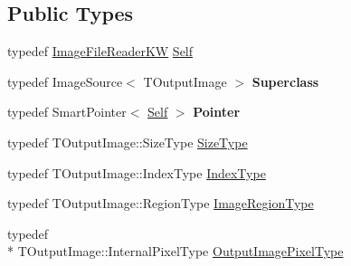 \subsection*{Public Types}
\begin{DoxyCompactItemize}
\item 
typedef \hyperlink{classitk_1_1_image_file_reader_k_w}{Image\-File\-Reader\-K\-W} \hyperlink{classitk_1_1_image_file_reader_k_w_a6616e1e0fe9f4aceb7f693250b5f5b5c}{Self}
\item 
\hypertarget{classitk_1_1_image_file_reader_k_w_afb5a9f09477bb47f45a4faf6832e74e4}{typedef Image\-Source$<$ T\-Output\-Image $>$ {\bfseries Superclass}}\label{classitk_1_1_image_file_reader_k_w_afb5a9f09477bb47f45a4faf6832e74e4}

\item 
\hypertarget{classitk_1_1_image_file_reader_k_w_a05a8d76fe334c335c3c432de498ca087}{typedef Smart\-Pointer$<$ \hyperlink{classitk_1_1_image_file_reader_k_w_a6616e1e0fe9f4aceb7f693250b5f5b5c}{Self} $>$ {\bfseries Pointer}}\label{classitk_1_1_image_file_reader_k_w_a05a8d76fe334c335c3c432de498ca087}

\item 
typedef T\-Output\-Image\-::\-Size\-Type \hyperlink{classitk_1_1_image_file_reader_k_w_a7a7f4acf918af20f820cdb57ab4ae18d}{Size\-Type}
\item 
typedef T\-Output\-Image\-::\-Index\-Type \hyperlink{classitk_1_1_image_file_reader_k_w_a9daa1ecf6fe0192e6ea86f9bf9785912}{Index\-Type}
\item 
typedef T\-Output\-Image\-::\-Region\-Type \hyperlink{classitk_1_1_image_file_reader_k_w_aeb29601addf7afcf200728eafc93dccd}{Image\-Region\-Type}
\item 
typedef \\*
T\-Output\-Image\-::\-Internal\-Pixel\-Type \hyperlink{classitk_1_1_image_file_reader_k_w_a3bc68922731e94450245260bc9eced45}{Output\-Image\-Pixel\-Type}
\end{DoxyCompactItemize}
